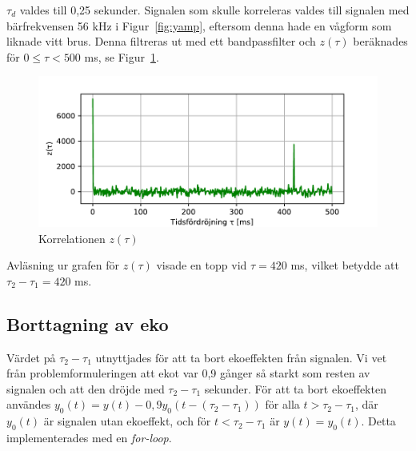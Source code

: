 \documentclass[10pt,twocolumn]{article}
\begin{document}
$\tau_d$ valdes till 0,25 sekunder. Signalen som skulle korreleras valdes till
signalen med bärfrekvensen 56 kHz i Figur~\ref{fig:yamp}, eftersom denna hade
en vågform som liknade vitt brus. Denna filtreras ut med ett bandpassfilter och
$z(\tau)$ beräknades för $0 \leq \tau < 500$ ms, se Figur~\ref{fig:corr}.

\begin{figure}[h]
    \centering
    \includegraphics[width=\linewidth]{figures/corr.pdf}
    \caption{Korrelationen $z(\tau)$}\label{fig:corr}
\end{figure}

Avläsning ur grafen för $z(\tau)$ visade en topp vid $\tau = 420$ ms, vilket
betydde att $\tau_2 - \tau_1 = 420$ ms.

\subsection{Borttagning av eko}\label{sub:echo}
Värdet på $\tau_2 - \tau_1$ utnyttjades för att ta bort ekoeffekten från signalen. Vi
vet från problemformuleringen att ekot var 0,9 gånger så starkt som resten av signalen 
och att den dröjde med $\tau_2 - \tau_1$ sekunder. För att ta bort ekoeffekten
användes $y_0(t) = y(t) - 0,9y_0(t - (\tau_2 - \tau_1))$ för alla $t > \tau_2
- \tau_1$, där $y_0(t)$ är signalen
utan ekoeffekt, och för $t < \tau_2 - \tau_1$ är $y(t) = y_0(t)$. 
Detta implementerades med en \textit{for-loop}.

\end{document}
